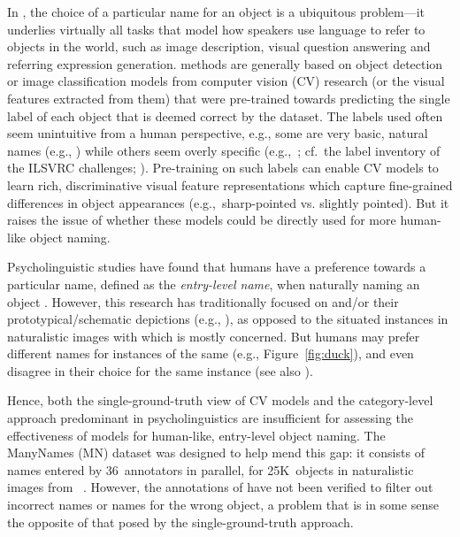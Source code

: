 In \lv, the choice of a particular name for an object is a ubiquitous problem---it underlies virtually all tasks that model how speakers use language to refer to objects in the world, such as image description, visual question answering and referring expression generation.
\lv methods are generally based on object detection or image classification models from computer vision (CV) research (or the visual features extracted from them) that were pre-trained towards predicting the single label of each object that is deemed correct by the dataset.
The labels used often seem unintuitive from a human perspective, e.g., some are very basic, natural names (e.g., ) while others seem overly specific (e.g.,\ ; cf.\ the label inventory of the ILSVRC challenges; \citealt{ILSVRC15}).
Pre-training on such labels can enable CV models to learn rich, discriminative visual feature representations which capture fine-grained differences in object appearances (e.g.,\ sharp-pointed vs. slightly pointed). 
But it raises the issue of whether these models could be directly used for more human-like object naming.

Psycholinguistic studies have found that humans have a preference towards a particular name, defined as the \textit{entry-level name}, when naturally naming an object \cite{rosch1976basic,Rosch1978,jolicoeur1984pictures}. 
However, this research has traditionally focused on \categories and/or their prototypical/schematic depictions (e.g., ), as opposed to the situated instances in naturalistic images with which \lv is mostly concerned.
But humans may prefer different names for instances of the same \category (e.g., Figure~\ref{fig:duck}), and even disagree in their choice for the same instance (see also \citealt{graf2016animal}).

Hence, both the single-ground-truth view of CV models and the category-level approach predominant in psycholinguistics are insufficient for assessing the effectiveness of \lv models for human-like, entry-level object naming.
The ManyNames (MN) dataset was designed to help mend this gap: it consists of names entered by 36~annotators in parallel, for 25K~objects in naturalistic images from \vg~\cite{krishna2016visualgenome}.
However, the annotations of \mn have not been verified to filter out incorrect names or names for the wrong object, a problem that is in some sense the opposite of that posed by the single-ground-truth approach.

